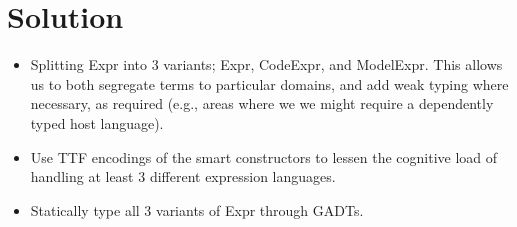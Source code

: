 \section{Solution}

\begin{itemize}
    
    \item Splitting Expr into 3 variants; Expr, CodeExpr, and ModelExpr.
          This allows us to both segregate terms to particular domains, and
          add weak typing where necessary, as required (e.g., areas where we
          we might require a dependently typed host language).
    
    \item Use TTF encodings of the smart constructors to lessen the cognitive load
          of handling at least 3 different expression languages.

    \item Statically type all 3 variants of Expr through GADTs.

\end{itemize}


